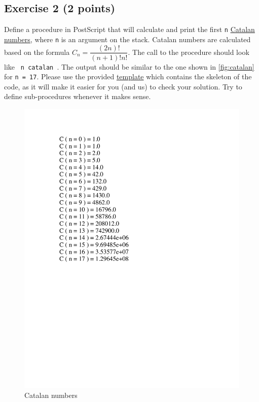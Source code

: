 \documentclass [11pt, a4wide, twoside]{article}
\begin{document}
\subsection*{Exercise 2 (2 points)}

Define a procedure in PostScript that will calculate and print the first \texttt{n} \href{https://en.wikipedia.org/wiki/Catalan_number}{Catalan numbers}, where \texttt{n} is an argument on the stack. Catalan numbers are calculated based on the formula $C_{n} = \dfrac{(2n)!}{(n+1)!n!}$.
The call to the procedure should look like \texttt{ n catalan }.
The output should be similar to the one shown in \autoref{fig:catalan} for \texttt{n = 17}.
Please use the provided \href{http://scg.unibe.ch/download/lectures/pl-exercise21/Assignment02-catalan-template.txt}{template} which contains the skeleton of the code, as it will make it easier for you (and us) to check your solution.
Try to define sub-procedures whenever it makes sense. 


\begin{figure}[h]
\includegraphics[width=0.358\linewidth]{figs/catalanNumbers.pdf}
\caption{Catalan numbers}
\label{fig:catalan}
\end{figure}
\end{document}
